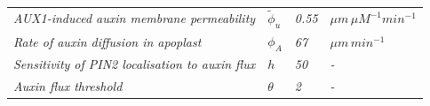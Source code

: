 \documentclass[11pt]{article}
\begin{document}
\begin{table}[htbp]
{\begin{tabular}{@{}>{\raggedright\arraybackslash\itshape}p{4.2cm}>{\raggedright\arraybackslash\itshape}p{0.6cm}>{\raggedright\arraybackslash\itshape}p{0.5cm}>{\raggedright\arraybackslash\itshape}p{2.1cm}@{}}
AUX1-induced auxin membrane permeability  &  \(\tilde{\phi}_u\)    & 0.55  & \(\mu m \, \mu M^{-1} min^{-1}\)  \\
Rate of auxin diffusion in apoplast      & \(\phi_A\)      & 67    &  \(\mu m \, min^{-1}\) \\
Sensitivity of PIN2 localisation to auxin flux        & \(h\)    & 50   &  - \\
Auxin flux threshold    &  \(\theta\)  & 2  & -  \\



  \bottomrule
\end{tabular}
}
\end{table}
\end{document}
